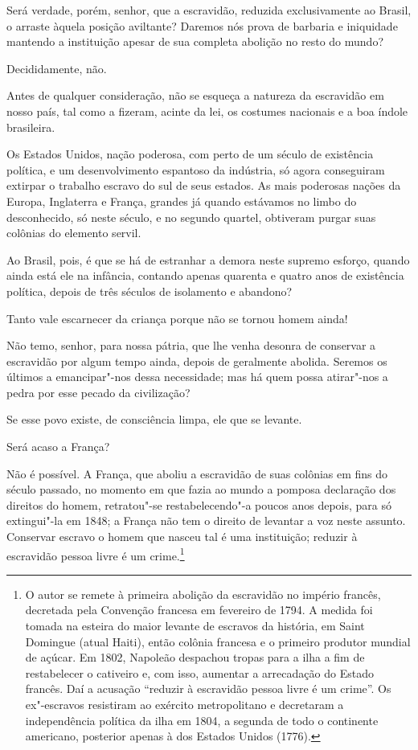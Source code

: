  Será verdade, porém, senhor, que a escravidão, reduzida exclusivamente
ao Brasil, o arraste àquela posição aviltante? Daremos nós prova de
barbaria e iniquidade mantendo a instituição apesar de sua completa
abolição no resto do mundo?

 Decididamente, não.

 Antes de qualquer consideração, não se esqueça a natureza da escravidão
em nosso país, tal como a fizeram, acinte da lei, os costumes nacionais
e a boa índole brasileira.

 Os Estados Unidos, nação poderosa, com perto de um século de existência
política, e um desenvolvimento espantoso da indústria, só agora
conseguiram extirpar o trabalho escravo do sul de seus estados. As mais
poderosas nações da Europa, Inglaterra e França, grandes já quando
estávamos no limbo do desconhecido, só neste século, e no segundo
quartel, obtiveram purgar suas colônias do elemento servil.

 Ao Brasil, pois, é que se há de estranhar a demora neste supremo
esforço, quando ainda está ele na infância, contando apenas quarenta e
quatro anos de existência política, depois de três séculos de
isolamento e abandono? 

 Tanto vale escarnecer da criança porque não se tornou homem ainda!

 Não temo, senhor, para nossa pátria, que lhe venha desonra de conservar
a escravidão por algum tempo ainda, depois de geralmente abolida.
Seremos os últimos a emancipar"-nos dessa necessidade; mas há quem
possa atirar"-nos a pedra por esse pecado da civilização?

 Se esse povo existe, de consciência limpa, ele que se levante.

 Será acaso a França?

 Não é possível. A França, que aboliu a escravidão de suas colônias em
fins do século passado, no momento em que fazia ao mundo a pomposa
declaração dos direitos do homem, retratou"-se restabelecendo"-a
poucos anos depois, para só extingui"-la em 1848; a França não tem o
direito de levantar a voz neste assunto. Conservar escravo o homem que
nasceu tal é uma instituição; reduzir à escravidão pessoa livre é um
crime.\footnote{ O autor se remete à primeira abolição da escravidão no império francês, decretada
pela Convenção francesa em fevereiro de 1794. A medida foi tomada na
esteira do maior levante de escravos da história, em Saint Domingue
(atual Haiti), então colônia francesa e o primeiro produtor mundial de
açúcar. Em 1802, Napoleão despachou tropas para a ilha a fim de
restabelecer o cativeiro e, com isso, aumentar a arrecadação do Estado
francês. Daí a acusação ``reduzir à escravidão pessoa livre é um crime''.
Os ex"-escravos resistiram ao exército metropolitano e decretaram a
independência política da ilha em 1804, a segunda de todo o continente
americano, posterior apenas à dos Estados Unidos (1776).}
 
